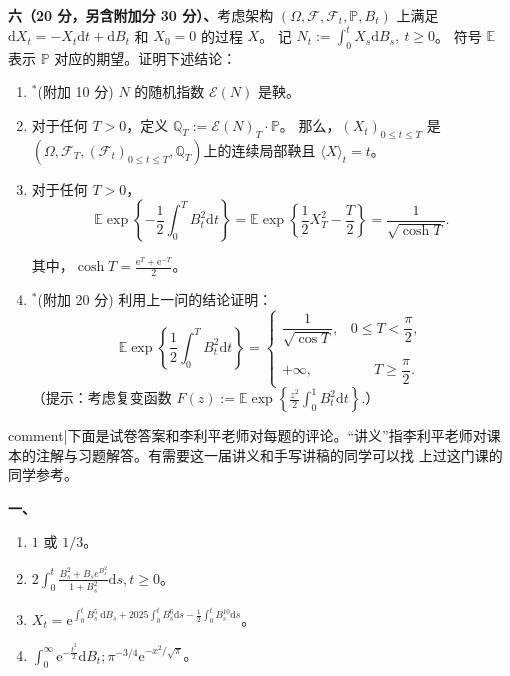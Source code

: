 \textbf{六（20 分，另含附加分 30 分）、}考虑架构 $\left(\Omega, \mathscr{F}, \mathscr{F}_{t}, \mathbb{P}, B_{t}\right)$ 上满足 $\mathrm{d} X_{t}=-X_{t} \mathrm{d} t+\mathrm{d} B_{t}$ 和 $X_{0}=0$ 的过程 $X$。
记 $N_{t}:=\int_{0}^{t} X_{s} \mathrm{d} B_{s},\ t \geq 0$。
符号 $\mathbb{E}$ 表示 $\mathbb{P}$ 对应的期望。证明下述结论：
\begin{enumerate}[label=(\arabic*)]
\item ${}^*$(附加 10 分) $N$ 的随机指数 $\mathscr{E}(N)$ 是鞅。

\item 对于任何 $T>0$，定义 $\mathbb{Q}_{T}:=\mathscr{E}(N)_{T} \cdot \mathbb{P}$。
那么，$\left(X_{t}\right)_{0 \leq t \leq T}$ 是 $\left(\Omega, \mathscr{F}_{T},\left(\mathscr{F}_{t}\right)_{0 \leq t \leq T}, \mathbb{Q}_{T}\right)$上的连续局部鞅且 $\langle X\rangle_{t}=t$。

\item 对于任何 $T>0$，
$$\mathbb{E} \exp \left\{-\frac{1}{2} \int_{0}^{T} B_{t}^{2} \mathrm{d} t\right\}
=\mathbb{E} \exp \left\{\frac{1}{2} X_{T}^{2}-\frac{T}{2}\right\}
=\frac{1}{\sqrt{\cosh T}}.$$

其中，$\cosh T=\frac{\mathrm{e}^{T}+\mathrm{e}^{-T}}{2}$。

\item ${}^*$(附加 20 分) 利用上一问的结论证明：
$$\mathbb{E} \exp \left\{\frac{1}{2} \int_{0}^{T} B_{t}^{2} \mathrm{d} t\right\}
=\begin{cases}
\dfrac{1}{\sqrt{\cos T}}, & 0 \leq T<\dfrac{\pi}{2}, \\ \\
+\infty, & \quad\ \ \ T \geq \dfrac{\pi}{2}.
\end{cases}$$
（提示：考虑复变函数 $F(z):=\mathbb{E} \exp \left\{\frac{z^{2}}{2} \int_{0}^{1} B_{t}^{2} \mathrm{d} t\right\}$.）
\end{enumerate}







{{comment|下面是试卷答案和李利平老师对每题的评论。“讲义”指李利平老师对课本的注解与习题解答。有需要这一届讲义和手写讲稿的同学可以找
上过这门课的同学参考。}}

    \textbf{一、}
    \begin{enumerate}[label=(\arabic*)]
    \item $1$ 或 $1/3$。
    \item $2 \int_{0}^{t} \frac{B_{s}^{2}+B_{s} e^{B_{s}^{2}}}{1+B_{s}^{2}} \mathrm{d} s, t \geq 0$。
    \item $X_{t}=\mathrm{e}^{\int_{0}^{t} B_{s}^{5} \mathrm{~d} B_{s}+2025 \int_{0}^{t} B_{s}^{6} \mathrm{d} s-\frac{1}{2} \int_{0}^{t} B_{s}^{10} \mathrm{d} s}$。
    \item $\int_{0}^{\infty} \mathrm{e}^{-\frac{t^{2}}{2}} \mathrm{d} B_{t} ; \pi^{-3/4} \mathrm{e}^{-x^{2}/\sqrt{\pi}}$。
    \end{enumerate}

